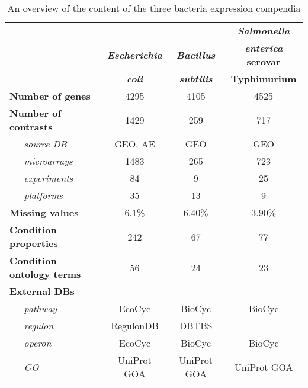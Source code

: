 \begin{table}
	\caption{An overview of the content of the three bacteria expression 
	compendia}
	\label{tab:colTB-overview}
	\begin{small}
	\begin{tabular}{@{}l c c c@{}}
	\toprule
	& & & {\bf\it\small Salmonella} \\
	& {\bf\it\small Escherichia} & {\bf\it\small Bacillus} & {\bf\small {\it 
	enterica} serovar} \\
	& {\bf\it\small coli} & {\bf\it\small subtilis} & {\bf\small  Typhimurium} 
	\\
	\midrule
	{\bf Number of genes} 		& 4295 & 4105 & 4525 \\
	{\bf Number of contrasts} 	& 1429 & 259 & 717 \\
	{\it ~~~source DB} 			& GEO, AE & GEO & GEO \\
	{\it ~~~microarrays} 		& 1483 & 265 & 723 \\
	{\it ~~~experiments}	 	& 84 & 9 & 25 \\
	{\it ~~~platforms} 			& 35 & 13 & 9 \\
	{\bf Missing values} 		& 6.1\% & 6.40\% & 3.90\% \\
	{\bf Condition properties} 	& 242 & 67 & 77 \\
	{\bf Condition ontology terms} & 56 & 24 & 23 \\
	\multicolumn{4}{l}{\bf External DBs} \\
	{\it ~~~pathway} 			& EcoCyc & BioCyc & BioCyc \\
	{\it ~~~regulon} 			& RegulonDB & DBTBS & \\
	{\it ~~~operon} 			& EcoCyc & BioCyc & BioCyc \\
	{\it ~~~GO} 				& UniProt GOA & UniProt GOA & UniProt GOA \\
	\bottomrule
	\end{tabular}
	\end{small}
\end{table}



